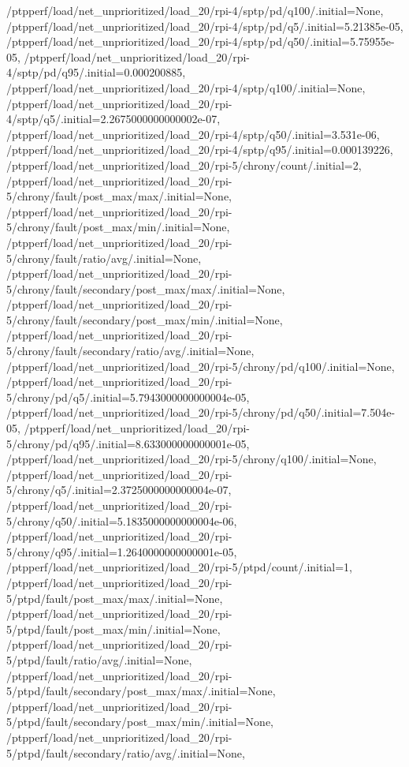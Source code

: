 {    /ptpperf/load/net_unprioritized/load_20/rpi-4/sptp/pd/q100/.initial=None,
    /ptpperf/load/net_unprioritized/load_20/rpi-4/sptp/pd/q5/.initial=5.21385e-05,
    /ptpperf/load/net_unprioritized/load_20/rpi-4/sptp/pd/q50/.initial=5.75955e-05,
    /ptpperf/load/net_unprioritized/load_20/rpi-4/sptp/pd/q95/.initial=0.000200885,
    /ptpperf/load/net_unprioritized/load_20/rpi-4/sptp/q100/.initial=None,
    /ptpperf/load/net_unprioritized/load_20/rpi-4/sptp/q5/.initial=2.2675000000000002e-07,
    /ptpperf/load/net_unprioritized/load_20/rpi-4/sptp/q50/.initial=3.531e-06,
    /ptpperf/load/net_unprioritized/load_20/rpi-4/sptp/q95/.initial=0.000139226,
    /ptpperf/load/net_unprioritized/load_20/rpi-5/chrony/count/.initial=2,
    /ptpperf/load/net_unprioritized/load_20/rpi-5/chrony/fault/post_max/max/.initial=None,
    /ptpperf/load/net_unprioritized/load_20/rpi-5/chrony/fault/post_max/min/.initial=None,
    /ptpperf/load/net_unprioritized/load_20/rpi-5/chrony/fault/ratio/avg/.initial=None,
    /ptpperf/load/net_unprioritized/load_20/rpi-5/chrony/fault/secondary/post_max/max/.initial=None,
    /ptpperf/load/net_unprioritized/load_20/rpi-5/chrony/fault/secondary/post_max/min/.initial=None,
    /ptpperf/load/net_unprioritized/load_20/rpi-5/chrony/fault/secondary/ratio/avg/.initial=None,
    /ptpperf/load/net_unprioritized/load_20/rpi-5/chrony/pd/q100/.initial=None,
    /ptpperf/load/net_unprioritized/load_20/rpi-5/chrony/pd/q5/.initial=5.7943000000000004e-05,
    /ptpperf/load/net_unprioritized/load_20/rpi-5/chrony/pd/q50/.initial=7.504e-05,
    /ptpperf/load/net_unprioritized/load_20/rpi-5/chrony/pd/q95/.initial=8.633000000000001e-05,
    /ptpperf/load/net_unprioritized/load_20/rpi-5/chrony/q100/.initial=None,
    /ptpperf/load/net_unprioritized/load_20/rpi-5/chrony/q5/.initial=2.3725000000000004e-07,
    /ptpperf/load/net_unprioritized/load_20/rpi-5/chrony/q50/.initial=5.1835000000000004e-06,
    /ptpperf/load/net_unprioritized/load_20/rpi-5/chrony/q95/.initial=1.2640000000000001e-05,
    /ptpperf/load/net_unprioritized/load_20/rpi-5/ptpd/count/.initial=1,
    /ptpperf/load/net_unprioritized/load_20/rpi-5/ptpd/fault/post_max/max/.initial=None,
    /ptpperf/load/net_unprioritized/load_20/rpi-5/ptpd/fault/post_max/min/.initial=None,
    /ptpperf/load/net_unprioritized/load_20/rpi-5/ptpd/fault/ratio/avg/.initial=None,
    /ptpperf/load/net_unprioritized/load_20/rpi-5/ptpd/fault/secondary/post_max/max/.initial=None,
    /ptpperf/load/net_unprioritized/load_20/rpi-5/ptpd/fault/secondary/post_max/min/.initial=None,
    /ptpperf/load/net_unprioritized/load_20/rpi-5/ptpd/fault/secondary/ratio/avg/.initial=None,
}
